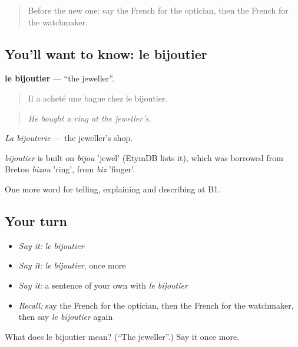 \label{lesson:FR-C448-bijoutier}



\begin{quote}
Before the new one: say the French for the optician, then the French for the watchmaker.
\end{quote}

\subsection*{You'll want to know: le bijoutier}
\textbf{le bijoutier} — \textquotedblleft{}the jeweller\textquotedblright{}.

\begin{quote}
Il a acheté une bague chez le bijoutier.
\end{quote}

\begin{quote}
\emph{He bought a ring at the jeweller's.}
\end{quote}

\emph{La bijouterie} — the jeweller's shop.

\begin{cousinweb}
\emph{bijoutier} is built on \emph{bijou} 'jewel' (EtymDB lists it), which was borrowed from Breton \emph{bizou} 'ring', from \emph{biz} 'finger'.
\end{cousinweb}

\begin{grammarlens}[title={What you've built}]
One more word for telling, explaining and describing at B1.
\end{grammarlens}

\subsection*{Your turn}
\begin{itemize}
\raggedright
  \item \emph{Say it:} \emph{le bijoutier}
  \item \emph{Say it:} \emph{le bijoutier}, once more
  \item \emph{Say it:} a sentence of your own with \emph{le bijoutier}
  \item \emph{Recall:} say the French for the optician, then the French for the watchmaker, then say \emph{le bijoutier} again
\end{itemize}

\begin{tcolorbox}[breakable,colback=teal!4,colframe=teal!35!black,title={Before you move on}]
What does le bijoutier mean? (\textquotedblleft{}The jeweller\textquotedblright{}.) Say it once more.
\end{tcolorbox}
